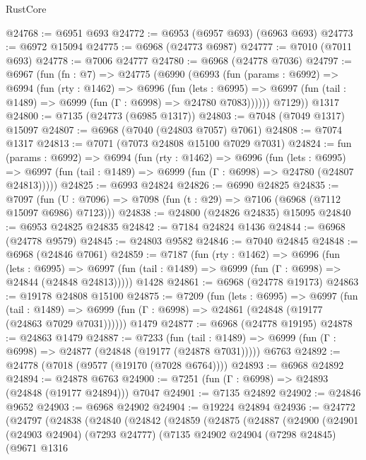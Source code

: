 \begin{lexlean}{RustCore}
\begin{coremodule}
@24768 := @6951 @693
@24772 := @6953 (@6957 @693) (@6963 @693)
@24773 := @6972 @15094
@24775 := @6968 (@24773 @6987)
@24777 := @7010 (@7011 @693)
@24778 := @7006 @24777
@24780 := @6968 (@24778 @7036)
@24797 := @6967
    (fun (fn : @7) =>
    @24775
      (@6990
        (@6993
          (fun (params : @6992) =>
          @6994
            (fun (rty : @1462) =>
            @6996
              (fun (lets : @6995) =>
              @6997 (fun (tail : @1489) => @6999 (fun (Γ : @6998) => @24780 @7083))))))
        @7129))
    @1317
@24800 := @7135 (@24773 (@6985 @1317))
@24803 := @7048 (@7049 @1317) @15097
@24807 := @6968 (@7040 (@24803 @7057) @7061)
@24808 := @7074 @1317
@24813 := @7071 (@7073 @24808 @15100 @7029 @7031)
@24824 := fun (params : @6992) =>
  @6994
    (fun (rty : @1462) =>
    @6996
      (fun (lets : @6995) =>
      @6997 (fun (tail : @1489) => @6999 (fun (Γ : @6998) => @24780 (@24807 @24813)))))
@24825 := @6993 @24824
@24826 := @6990 @24825
@24835 := @7097
    (fun (U : @7096) => @7098 (fun (t : @29) => @7106 (@6968 (@7112 @15097 @6986) @7123)))
@24838 := @24800 (@24826 @24835) @15095
@24840 := @6953 @24825 @24835
@24842 := @7184 @24824 @1436
@24844 := @6968 (@24778 @9579)
@24845 := @24803 @9582
@24846 := @7040 @24845
@24848 := @6968 (@24846 @7061)
@24859 := @7187
    (fun (rty : @1462) =>
    @6996
      (fun (lets : @6995) =>
      @6997 (fun (tail : @1489) => @6999 (fun (Γ : @6998) => @24844 (@24848 @24813)))))
    @1428
@24861 := @6968 (@24778 @19173)
@24863 := @19178 @24808 @15100
@24875 := @7209
    (fun (lets : @6995) =>
    @6997
      (fun (tail : @1489) =>
      @6999 (fun (Γ : @6998) => @24861 (@24848 (@19177 (@24863 @7029 @7031))))))
    @1479
@24877 := @6968 (@24778 @19195)
@24878 := @24863 @1479
@24887 := @7233
    (fun (tail : @1489) => @6999 (fun (Γ : @6998) => @24877 (@24848 (@19177 (@24878 @7031)))))
    @6763
@24892 := @24778 (@7018 (@9577 (@19170 (@7028 @6764))))
@24893 := @6968 @24892
@24894 := @24878 @6763
@24900 := @7251 (fun (Γ : @6998) => @24893 (@24848 (@19177 @24894))) @7047
@24901 := @7135 @24892
@24902 := @24846 @9652
@24903 := @6968 @24902
@24904 := @19224 @24894
@24936 := @24772
    (@24797
      (@24838
        (@24840
          (@24842
            (@24859
              (@24875
                (@24887
                  (@24900
                    (@24901
                      (@24903 @24904)
                      (@7293 @24777)
                      (@7135
                        @24902
                        @24904
                        (@7298 @24845)
                        (@9671
                          @1316

\end{coremodule}
\end{lexlean}
